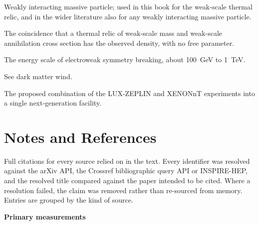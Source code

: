 \begin{description}[style=nextline,leftmargin=0pt,labelwidth=0pt,labelsep=0pt,
  font=\sffamily\bfseries\small,itemsep=5pt]
\item[WIMP] Weakly interacting massive particle; used in this book for the
weak-scale thermal relic, and in the wider literature also for any weakly
interacting massive particle.

\item[WIMP miracle] The coincidence that a thermal relic of weak-scale mass
and weak-scale annihilation cross section has the observed density, with no
free parameter.

\item[Weak scale] The energy scale of electroweak symmetry breaking, about
100~GeV to 1~TeV.

\item[WIMP wind] See dark matter wind.

\item[XLZD] The proposed combination of the LUX-ZEPLIN and XENONnT
experiments into a single next-generation facility.
\end{description}

\chapter*{Notes and References}
\thispagestyle{plain}

\noindent\small
Full citations for every source relied on in the text. Every identifier was
resolved against the arXiv API, the Crossref bibliographic query API or
INSPIRE-HEP, and the resolved title compared against the paper intended to
be cited. Where a resolution failed, the claim was removed rather than
re-sourced from memory. Entries are grouped by the kind of source.

\vspace{10pt}
{\sffamily\bfseries\small Primary measurements}

